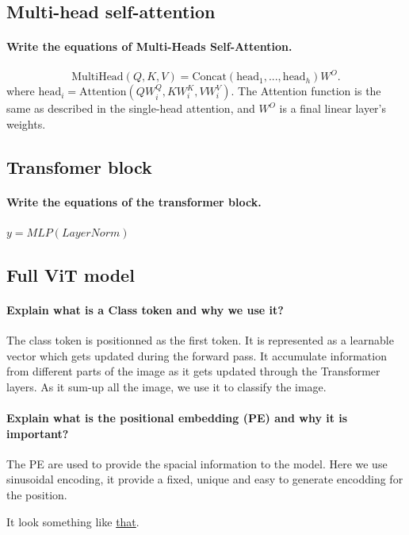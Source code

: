 \documentclass{article}
\theoremstyle{plain}%
\theoremstyle{definition}
\theoremstyle{remark}
\begin{document}
\subsection{Multi-head self-attention}

\paragraph{Write the equations of Multi-Heads Self-Attention.}
\[
    \text{MultiHead}(Q, K, V) = \text{Concat}(\text{head}_1, ..., \text{head}_h)W^O
.\]
where $\text{head}_i = \text{Attention}(QW_i^Q, KW_i^K, VW_i^V)$. The Attention function is the same as described in the single-head attention, and $W^O$ is a final linear layer's weights.

\subsection{Transfomer block}

\paragraph{Write the equations of the transformer block.}
$y = MLP(LayerNorm)$

\subsection{Full ViT model}

\paragraph{Explain what is a Class token and why we use it?}
The class token is positionned as the first token. It is represented as a learnable vector which gets updated during the forward pass. It accumulate information from different parts of the image as it gets updated through the Transformer layers. As it sum-up all the image, we use it to classify the image.

\paragraph{Explain what is the positional embedding (PE) and why it is important?}
The PE are used to provide the spacial information to the model. Here we use sinusoidal encoding, it provide a fixed, unique and easy to generate encodding for the position. 

It look something like \href{https://miro.medium.com/v2/resize:fit:640/format:webp/1*erwsFgn3I-FGzUKOIeQSAw.png}{that}.
\end{document}

